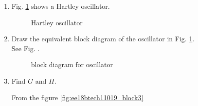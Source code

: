 \begin{enumerate}[label=\thesection.\arabic*.,ref=\thesection.\theenumi]

\item Fig. \ref{fig:ee18btech11019_hart} shows a Hartley oscillator.

\begin{figure}[ht]
    \begin{center}
	    \resizebox{\columnwidth}{!}{}
	\end{center}
\caption{Hartley oscillator}
\label{fig:ee18btech11019_hart}
\end{figure}
\item Draw the equivalent block diagram of the  oscillator in Fig. \ref{fig:ee18btech11019_hart}.\\
\solution See Fig. \label{fig:ee18btech11019_hart_block}. 
%
\begin{figure}[!ht]
    \begin{center}
		
		\resizebox{\columnwidth}{!}{} %
	\end{center}
\caption{block diagram for oscillator}
\label{fig:ee18btech11019_hart_block}
\end{figure}

\item Find $G$ and $H$.

\solution From the figure \ref{fig:ee18btech11019_block3}\\

\begin{figure}[!ht]
    \begin{center}
		\resizebox{\columnwidth}{!}{}
		

\end{center}
\end{figure}
\end{enumerate}
